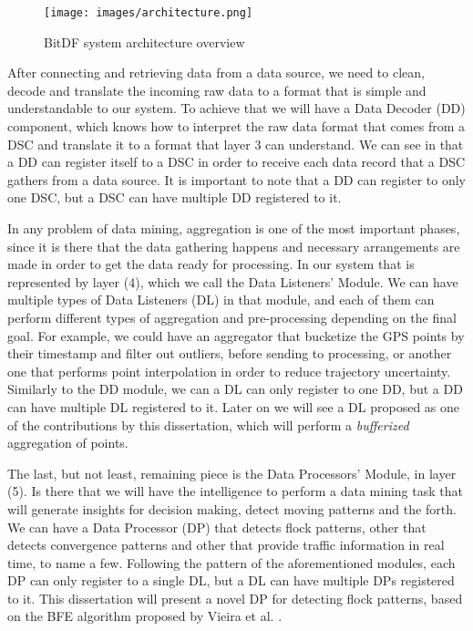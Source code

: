 \begin{figure}[h!]
    \centering
    \texttt{[image: images/architecture.png]}
    \caption{BitDF system architecture overview}
    \label{fig:architecture}
\end{figure}

After connecting and retrieving data from a data source, we need to clean, decode and translate the incoming raw data to
a format that is simple and understandable to our system. To achieve that we will have a Data Decoder (DD) component,
which knows how to interpret the raw data format that comes from a DSC and translate it to a format that layer 3 can
understand. We can see in  that a DD can register itself to a DSC in order to receive each data
record that a DSC gathers from a data source. It is important to note that a DD can register to only one DSC, but a DSC
can have multiple DD registered to it.

In any problem of data mining, aggregation is one of the most important phases, since it is there that the data
gathering happens and necessary arrangements are made in order to get the data ready for processing. In our system that
is represented by layer (4), which we call the Data Listeners' Module. We can have multiple types of Data Listeners (DL)
in that module, and each of them can perform different types of aggregation and pre-processing depending on the final
goal.  For example, we could have an aggregator that bucketize the GPS points by their timestamp and filter out
outliers, before sending to processing, or another one that performs point interpolation in order to reduce trajectory
uncertainty. Similarly to the DD module, we can a DL can only register to one DD, but a DD can have multiple DL
registered to it. Later on we will see a DL proposed as one of the contributions by this dissertation, which will
perform a \textit{bufferized} aggregation of points.

The last, but not least, remaining piece is the Data Processors' Module, in layer (5). Is there that we will have the
intelligence to perform a data mining task that will generate insights for decision making, detect moving patterns and
the forth. We can have a Data Processor (DP) that detects flock patterns, other that detects convergence patterns and
other that provide traffic information in real time, to name a few. Following the pattern of the aforementioned modules,
each DP can only register to a single DL, but a DL can have multiple DPs registered to it. This dissertation will
present a novel DP for detecting flock patterns, based on the BFE algorithm proposed by Vieira et al. \citep{vieira}.

